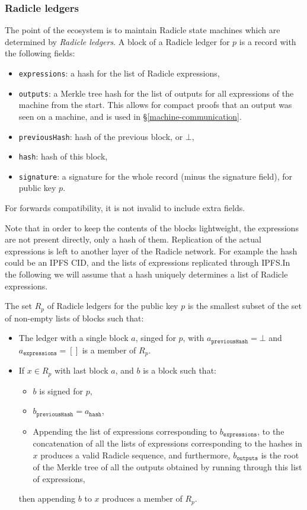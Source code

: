 \documentclass[a4paper, oneside, 10pt]{amsart}
\begin{document}
\subsubsection{Radicle ledgers}

The point of the ecosystem is to maintain Radicle state machines which are
determined by \emph{Radicle ledgers}. A block of a Radicle ledger for $p$ is a
record with the following fields:
\begin{itemize}
\item
  \texttt{expressions}: a hash for the list of Radicle expressions,
\item
  \texttt{outputs}: a Merkle tree hash for the list of outputs for all
  expressions of the machine from the start. This allows for compact proofs that
  an output was seen on a machine, and is used in \S\ref{machine-communication}.
\item
  \texttt{previousHash}: hash of the previous block, or $\bot$,
\item
  \texttt{hash}: hash of this block,
\item
  \texttt{signature}: a signature for the whole record (minus the signature
  field), for public key $p$.
\end{itemize}
For forwards compatibility, it is not invalid to include extra fields.

Note that in order to keep the contents of the blocks lightweight, the
expressions are not present directly, only a hash of them. Replication of the
actual expressions is left to another layer of the Radicle network. For example
the hash could be an IPFS CID, and the lists of expressions replicated through
IPFS.\@ In the following we will assume that a hash uniquely determines a list
of Radicle expressions.

The set $R_p$ of Radicle ledgers for the public key $p$ is the smallest subset
of the set of non-empty lists of blocks such that:
\begin{itemize}
\item
  The ledger with a single block $a$, singed for $p$, with
  $a_\mathtt{previousHash} = \bot$ and $a_\mathtt{expressions} = []$ is a member
  of $R_p$.
\item
  If $x \in R_p$ with last block $a$, and $b$ is a block such that:
  \begin{itemize}
  \item
    $b$ is signed for $p$,
  \item
    $b_\mathtt{previousHash} = a_\mathtt{hash}$,
  \item
    Appending the list of expressions corresponding to $b_\mathtt{expressions}$,
    to the concatenation of all the lists of expressions corresponding to the
    hashes in $x$ produces a valid Radicle sequence, and furthermore,
    $b_\mathtt{outputs}$ is the root of the Merkle tree of all the outputs
    obtained by running through this list of expressions,
  \end{itemize}
  then appending $b$ to $x$ produces a member of $R_p$.
\end{itemize}
\end{document}
